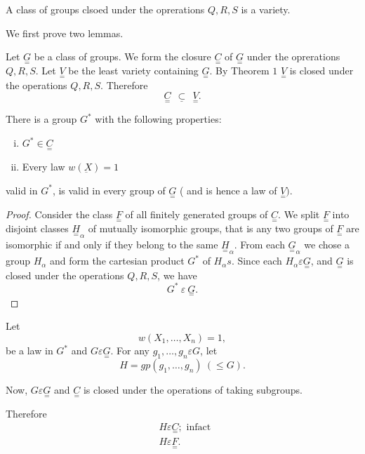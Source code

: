 \begin{Theorem} %
  A class of groups  clsoed under the oprerations $ Q,R,S $ is a variety.
\end{Theorem}

We first prove two lemmas.

Let $ \underset{=}{G} $ be a class of groups. We form the closure $
\underset{=}{C} $ of  $ \underset{=}{G} $ under the oprerations $
Q,R,S $. Let $ \underset{=}{V} $ be the least variety containing $
\underset{=}{G} $. By Theorem $1$ $ \underset{=}{V} $ is closed under
the operations $ Q,R,S $. Therefore 
$$
\underset{=}{C} ~~\underline{\subset} ~~\underset{=}{V}.
$$
\setcounter{Lemma}{0}
\begin{Lemma}%
  There is a group  $G^*$ with the following properties:
  \begin{enumerate}[(i)]
  \item  $G^* \in \underset{=}{C}$
  \item Every law $w (\underbar{X}) = 1$
  \end{enumerate}
  valid in $G^*$, is valid in every group of $\underset{=}{G}$ ( and
  is hence a law of $\underset{=}{V} )$.  
\end{Lemma}

\begin{proof}
  Consider the class $\underset{=}{F}$ of all finitely generated
  groups of $\underset{=}{C}$. We split $\underset{=}{F}$ into
  disjoint classes $\underset{=}{H}_\alpha $ of mutually isomorphic
  groups, that is any two groups of $\underset{=}{F}$ are isomorphic
  if and only if they belong to the same $\underset{=}{H}_\alpha
  $. From each $\underset{=}{G}_\alpha$ we chose a group $H_\alpha$
  and form the cartesian product $G^*$ of  $H_\alpha s $. Since each
  $H_\alpha \varepsilon \underset{=}{G} $, and $\underset{=}{G}$ is
  closed under the operations $Q,R,S$, we have  
  $$
  G^* ~\varepsilon~ \underset{=}{G}. 
  $$
\end{proof}

Let
$$
 w(X_1, \ldots, X_n ) = 1,
$$
be a law in $G^*$ and $G \varepsilon \underset{=}{G} $. For any $g_1,
\ldots,g_n \varepsilon G $, let  
$$
H = gp (g_1, \ldots, g_n) ~ ( \leq G ). 
$$

Now, $G \varepsilon \underset{=}{G} $ and $\underset{=}{C}$ is closed
under the operations of taking subgroups. 

Therefore
\begin{align*}
  &H \varepsilon \underset{=}{C}; \text{ infact } \\
  &H \varepsilon \underset{=}{F}.
\end{align*}

